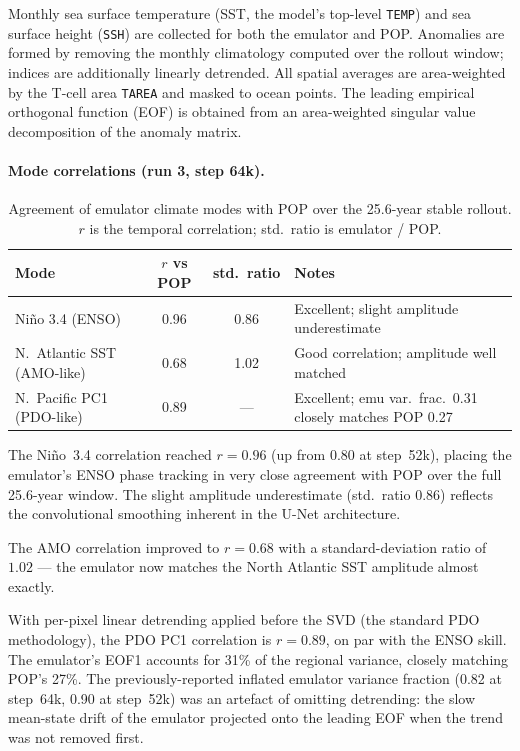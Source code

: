 \documentclass[11pt]{article}
\begin{document}
Monthly sea surface temperature (SST, the model's top-level \texttt{TEMP}) and
sea surface height (\texttt{SSH}) are collected for both the emulator and POP.
Anomalies are formed by removing the monthly climatology computed over the
rollout window; indices are additionally linearly detrended. All spatial averages
are area-weighted by the T-cell area \texttt{TAREA} and masked to ocean points.
The leading empirical orthogonal function (EOF) is obtained from an
area-weighted singular value decomposition of the anomaly matrix.

\label{sec:run3diag}
\paragraph{Mode correlations (run 3, step 64k).}
\begin{table}[h]
\centering
\caption{Agreement of emulator climate modes with POP over the 25.6-year stable
rollout. $r$ is the temporal correlation; std.\ ratio is emulator / POP.}
\label{tab:modes}
\begin{tabular}{lccl}
\toprule
Mode & $r$ vs POP & std.\ ratio & Notes \\
\midrule
Ni\~no 3.4 (ENSO) & 0.96 & 0.86 & Excellent; slight amplitude underestimate \\
N.\ Atlantic SST (AMO-like) & 0.68 & 1.02 & Good correlation; amplitude well matched \\
N.\ Pacific PC1 (PDO-like) & 0.89 & --- & Excellent; emu var.\ frac.\ 0.31 closely matches POP 0.27 \\
\bottomrule
\end{tabular}
\end{table}

The Ni\~no~3.4 correlation reached $r=0.96$ (up from $0.80$ at step~52k), placing
the emulator's ENSO phase tracking in very close agreement with POP over the full
25.6-year window. The slight amplitude underestimate (std.\ ratio 0.86) reflects
the convolutional smoothing inherent in the U-Net architecture.

The AMO correlation improved to $r=0.68$ with a standard-deviation ratio of $1.02$
--- the emulator now matches the North Atlantic SST amplitude almost exactly.

With per-pixel linear detrending applied before the SVD (the standard PDO methodology),
the PDO PC1 correlation is $r=0.89$, on par with the ENSO skill. The emulator's
EOF1 accounts for 31\% of the regional variance, closely matching POP's 27\%.
The previously-reported inflated emulator variance fraction (0.82 at step~64k, 0.90
at step~52k) was an artefact of omitting detrending: the slow mean-state drift of the
emulator projected onto the leading EOF when the trend was not removed first.
\end{document}
